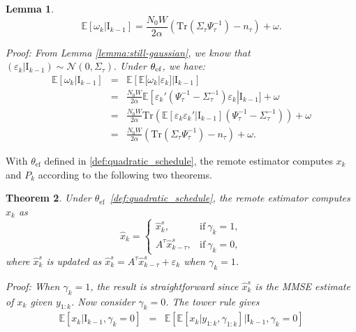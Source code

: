 \documentclass[twocolumn]{autart}    \usepackage{cite}
\newtheorem{theorem}{Theorem}[section]
\newtheorem{lemma}[theorem]{Lemma}
\begin{document}
{{\begin{lemma}
\begin{equation}
\mathbb E[\omega_k|\mathrm{I}_{k-1}]=
\frac{N_0W}{2\alpha}\left(\mathrm{Tr}(
\Sigma_\tau\Psi_\tau^{-1})-{n_\tau}\right)+\omega.
\end{equation}
\begin{pf*}{Proof:}
From Lemma \ref{lemma:still-gaussian}, we know that
$ (\varepsilon_k|
  {\mathrm{I}_{k-1}}) \sim \mathcal
  N(0, {\Sigma_\tau}).$
Under $\theta_{\rm ef}$, we have:
\begin{eqnarray*}
  \mathbb E[\omega_k|\mathrm{I}_{k-1}]&=&\mathbb E\left[\mathbb E[\omega_k|\varepsilon_k]|\mathrm{I}_{k-1}\right]\\
  &=&\frac{N_0W}{2\alpha}\mathbb E\left[\varepsilon_k'
  \left(\Psi_\tau^{-1}-\Sigma_\tau^{-1}
  \right)
  \varepsilon_k\right|\mathrm{I}_{k-1}]+\omega\\
&=&\frac{N_0W}{2\alpha}
   \mathrm{Tr}\left(\mathbb E\left[\varepsilon_k
  \varepsilon_k'|\mathrm{I}_{k-1}\right](\Psi_\tau^{-1}-\Sigma_\tau^{-1})
   \right)+\omega\\
  &=&\frac{N_0W}{2\alpha}\left(\mathrm{Tr}(
\Sigma_\tau\Psi_\tau^{-1})-{n_\tau}\right)+\omega.
\end{eqnarray*}
\end{pf*}
\end{lemma}
With $\theta_{\text{ef}}$ defined in \eqref{def:quadratic_schedule}, the remote estimator computes $x_k$ and $P_k$ according to the following two theorems.
\begin{theorem}\label{theorem:mmse-proof}
Under $\theta_{\mathrm{ef}}$~\eqref{def:quadratic_schedule},
the remote estimator computes $\hat{x}_k$ as
\begin{equation}\label{eqn:mmse-estimate}
\hat{x}_k = \left\{\begin{array}{ll}\hat{x}_k^s,
 & \mathrm{if}~\gamma_k = 1, \\
  A^{\tau}\hat x_{k-\tau}^s, & \mathrm{if}~\gamma_k = 0,\end{array}\right.
\end{equation}
where $\hat x_k^s$ is updated as $\hat x_k^s=A^{\tau}\hat x_{k-\tau}^s+\varepsilon_k$ when $\gamma_k=1$.
\begin{pf*}{Proof:}
    When $\gamma_k = 1$, the result is straightforward
    since $\hat{x}_k^s$ is the MMSE estimate of $x_k$ given
     $y_{1:k}$. Now consider $\gamma_k = 0$. The tower rule gives
    \begin{eqnarray*}
    \mathbb{E}\left[x_k|\mathrm{I}_{k-1},
    \gamma_k=0\right]
&=&\mathbb{E}\left[\mathbb{E}
    \left[x_k|y_{1:k},\gamma_{1:k}\right]
    |\mathrm{I}_{k-1},
    \gamma_k=0\right]\\

\end{eqnarray*}
\end{pf*}
\end{theorem}}}
\end{document}
